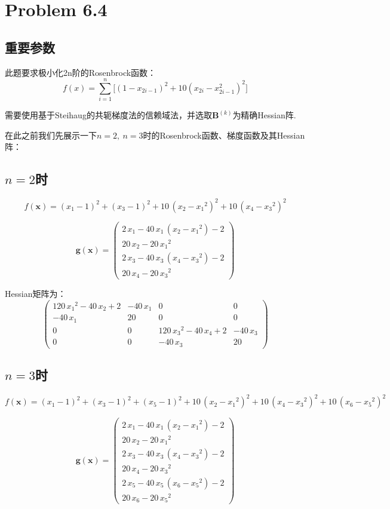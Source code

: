 \newpage
\section{Problem 6.4}
\subsection{重要参数}
此题要求极小化2n阶的Rosenbrock函数：
\begin{equation}
f(x)=\sum_{i=1}^{n}\Big[(1-x_{2i-1})^2+10(x_{2i}-x_{2i-1}^2)^2\Big]
\end{equation}

需要使用基于Steihaug的共轭梯度法的信赖域法，并选取$\bm{B}^{(k)}$为精确Hessian阵.

在此之前我们先展示一下$n=2,\ n=3$时的Rosenbrock函数、梯度函数及其Hessian阵：

\subsection*{$n=2$时}
\[f(\bm{x})={\left(x_{1}-1\right)}^2+{\left(x_{3}-1\right)}^2+10\,{\left(x_{2}-{x_{1}}^2\right)}^2+10\,{\left(x_{4}-{x_{3}}^2\right)}^2\]

\[\bm{g}(\bm{x})=\left(\begin{array}{c} 2\,x_{1}-40\,x_{1}\,\left(x_{2}-{x_{1}}^2\right)-2\\ 20\,x_{2}-20\,{x_{1}}^2\\ 2\,x_{3}-40\,x_{3}\,\left(x_{4}-{x_{3}}^2\right)-2\\ 20\,x_{4}-20\,{x_{3}}^2 \end{array}\right)\]

Hessian矩阵为：
\[\left(\begin{array}{cccc} 120\,{x_{1}}^2-40\,x_{2}+2 & -40\,x_{1} & 0 & 0\\ -40\,x_{1} & 20 & 0 & 0\\ 0 & 0 & 120\,{x_{3}}^2-40\,x_{4}+2 & -40\,x_{3}\\ 0 & 0 & -40\,x_{3} & 20 \end{array}\right)\]

\subsection*{$n=3$时}
\[f(\bm{x})={\left(x_{1}-1\right)}^2+{\left(x_{3}-1\right)}^2+{\left(x_{5}-1\right)}^2+10\,{\left(x_{2}-{x_{1}}^2\right)}^2+10\,{\left(x_{4}-{x_{3}}^2\right)}^2+10\,{\left(x_{6}-{x_{5}}^2\right)}^2\]

\[\bm{g}(\bm{x})= \left(\begin{array}{c} 2\,x_{1}-40\,x_{1}\,\left(x_{2}-{x_{1}}^2\right)-2\\ 20\,x_{2}-20\,{x_{1}}^2\\ 2\,x_{3}-40\,x_{3}\,\left(x_{4}-{x_{3}}^2\right)-2\\ 20\,x_{4}-20\,{x_{3}}^2\\ 2\,x_{5}-40\,x_{5}\,\left(x_{6}-{x_{5}}^2\right)-2\\ 20\,x_{6}-20\,{x_{5}}^2 \end{array}\right)\]

